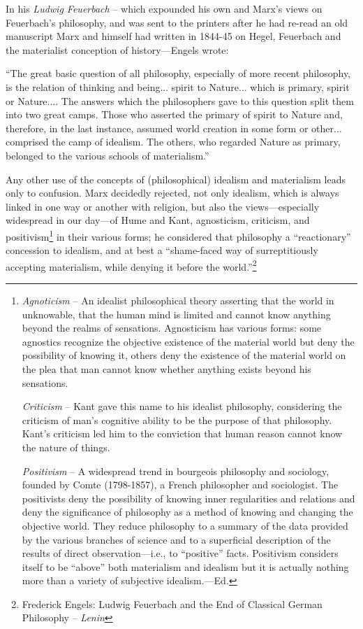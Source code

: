 \documentclass[a4paper,12pt]{book}
\newcommand{\q}[1]{``#1''}
\begin{document}
In his \emph{Ludwig Feuerbach} -- which expounded his own and Marx’s views on Feuerbach’s philosophy, and was sent to the printers after he had re-read an old manuscript Marx and himself had written in 1844-45 on Hegel, Feuerbach and the materialist conception of history—Engels wrote:

\begin{center}
\footnotesize{\q{The great basic question of all philosophy, especially of more recent philosophy, is the relation of thinking and being... spirit to Nature... which is primary, spirit or Nature.... The answers which the philosophers gave to this question split them into two great camps. Those who asserted the primary of spirit to Nature and, therefore, in the last instance, assumed world creation in some form or other... comprised the camp of idealism. The others, who regarded Nature as primary, belonged to the various schools of materialism.}}
\end{center}

 Any other use of the concepts of (philosophical) idealism and materialism leads only to confusion. Marx decidedly rejected, not only idealism, which is always linked in one way or another with religion, but also the views—especially widespread in our day—of Hume and Kant, agnosticism, criticism, and positivism\footnote{\emph{Agnoticism} -- An idealist philosophical theory asserting that the world in unknowable, that the human mind is limited and cannot know anything beyond the realms of sensations. Agnosticism has various forms: some agnostics recognize the objective existence of the material world but deny the possibility of knowing it, others deny the existence of the material world on the plea that man cannot know whether anything exists beyond his sensations.

\emph{Criticism} -- Kant gave this name to his idealist philosophy, considering the criticism of man’s cognitive ability to be the purpose of that philosophy. Kant’s criticism led him to the conviction that human reason cannot know the nature of things.

\emph{Positivism} -- A widespread trend in bourgeois philosophy and sociology, founded by Comte (1798-1857), a French philosopher and sociologist. The positivists deny the possibility of knowing inner regularities and relations and deny the significance of philosophy as a method of knowing and changing the objective world. They reduce philosophy to a summary of the data provided by the various branches of science and to a superficial description of the results of direct observation—i.e., to “positive” facts. Positivism considers itself to be “above” both materialism and idealism but it is actually nothing more than a variety of subjective idealism.—Ed.} in their various forms; he considered that philosophy a “reactionary” concession to idealism, and at best a “shame-faced way of surreptitiously accepting materialism, while denying it before the world.”\footnote{Frederick Engels: Ludwig Feuerbach and the End of Classical German Philosophy -- \emph{Lenin}}
\end{document}
